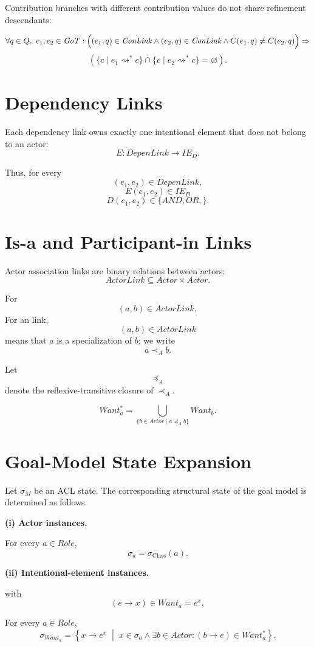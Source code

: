 \documentclass[11pt,a4paper]{article}
\newcommand{\Actor}{\mathit{Actor}}
\newcommand{\Role}{\mathit{Role}}
\newcommand{\IED}{\mathit{IE}_{D}}
\newcommand{\GoT}{\mathit{GoT}}
\newcommand{\ConLink}{\mathit{ConLink}}
\newcommand{\DepenLink}{\mathit{DepenLink}}
\begin{document}
Contribution branches with different contribution values do not share refinement descendants:

\[
\forall q\in Q,\ e_1,e_2\in\GoT:
\Bigl(
(e_1,q)\in\ConLink
\land
(e_2,q)\in\ConLink
\land
C(e_1,q)\neq C(e_2,q)
\Bigr)
\Rightarrow
\]
\[
\left(
\{c\mid e_1\rightsquigarrow^{*}c\}
\cap
\{c\mid e_2\rightsquigarrow^{*}c\}
=
\varnothing
\right).\tag{WF-CON}
\]

\section{Dependency Links}

Each dependency link owns exactly one intentional element that does not belong to an actor:
\[
E
:
\DepenLink
\rightarrow
\IED.
\]

Thus, for every
\[
(e_1,e_2)\in\DepenLink,
\]
\[
E(e_1,e_2)\in\IED
\]
\[
D(e_1,e_2)
\in
\{
\mathit{AND},
\mathit{OR},
\}.
\]


\section{Is-a and Participant-in Links}

Actor association links are binary relations between actors:
\[
ActorLink \subseteq Actor \times Actor.
\]

For
\[
(a,b)\in ActorLink,
\]
For an  link,
\[
(a,b)\in ActorLink
\]
means that \(a\) is a specialization of \(b\); we write
\[
a \prec_A b.
\]

Let
\[
\preceq_A
\]
denote the reflexive-transitive closure of \(\prec_A\).

\[
Want_a^{*}
=
\bigcup_{\{b\in Actor\mid a\preceq_A b\}}
Want_b.
\]


\section{Goal-Model State Expansion}

Let \(\sigma_M\) be an ACL state. 
The corresponding structural state of the goal model is determined as follows.

\medskip
\noindent
\textbf{(i) Actor instances.}

For every \(a\in\Role\),
\[
\sigma_a
=
\sigma_{\mathrm{Class}}(a).
\]

\medskip
\noindent
\textbf{(ii) Intentional-element instances.}

with \[
(e \to x)\in Want_a = e^{x},
\]  

For every \(a\in\Role\),
\[
\sigma_{Want_a}
=
\left\{
x\to e^{x}
\;\middle|\;
x\in\sigma_a
\land
\exists b\in\Actor:
(b\to e)\in Want_a^{*}
\right\}.
\]
\end{document}
